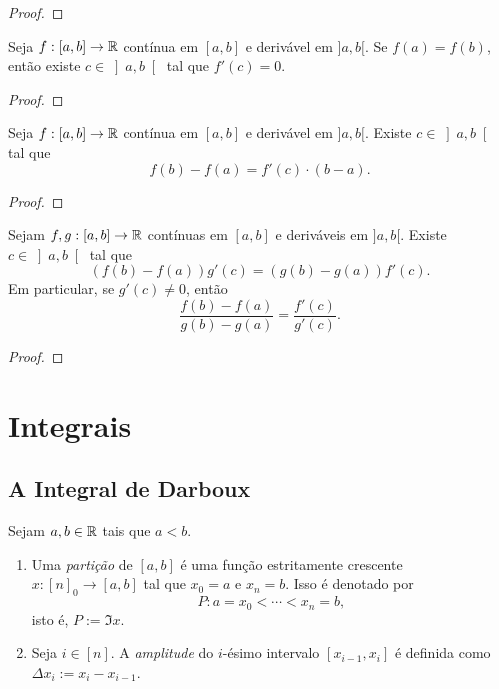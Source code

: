 \begin{proof}
    \blackproof
\end{proof}

\begin{theorem}[Rolle] \label{teo.calc1:rolle}
    Seja $f: [a,b] \to \mathbb{R}$ contínua em $[a,b]$ e derivável em $]a,b[$. Se $f(a) = f(b)$, então existe $c \in \left]a,b\right[$ tal que $f'(c) = 0$.
\end{theorem}

\begin{proof}
    \blackproof
\end{proof}

\begin{theorem} \label{teo.calc1:tvm}
    Seja $f: [a,b] \to \mathbb{R}$ contínua em $[a,b]$ e derivável em $]a,b[$. Existe $c \in \left]a,b\right[$ tal que
        \[
            f(b) - f(a) = f'(c) \cdot (b-a).
        \]
\end{theorem}

\begin{proof}
    \blackproof
\end{proof}

\begin{theorem}[Cauchy] \label{teo.calc1:tvm_cauchy}
    Sejam $f,g : [a,b] \to \mathbb{R}$ contínuas em $[a,b]$ e deriváveis em $]a,b[$. Existe $c \in \left] a,b \right[$ tal que
        \[
            (f(b) - f(a)) g'(c) = (g(b) - g(a)) f'(c).
        \]
    Em particular, se $g'(c) \neq 0$, então
        \[
            \dfrac{f(b) - f(a)}{g(b) - g(a)} = \dfrac{f'(c)}{g'(c)}.
        \]
\end{theorem}

\begin{proof}
    \blackproof
\end{proof}

\chapter{Integrais}

\section{A Integral de Darboux}

Sejam $a,b \in \mathbb{R}$ tais que $a<b$.

\begin{definition}
    \leavevmode
        \begin{enumerate}[leftmargin=*, align=left, label=\textbf{(\alph*)}]
            \item Uma \emph{partição} de $[a,b]$ é uma função estritamente crescente $x : [n]_0 \to [a,b]$ tal que $x_0 = a$ e $x_n = b$. Isso é denotado por
                \[
                    P : a = x_0 < \cdots < x_n = b,
                \]
            isto é, $P := \Im x$.
            \item Seja $i \in [n]$. A \emph{amplitude} do $i$-ésimo intervalo $[x_{i-1}, x_i]$ é definida como $\Delta x_i := x_i - x_{i-1}$.
        \end{enumerate}
\end{definition}

